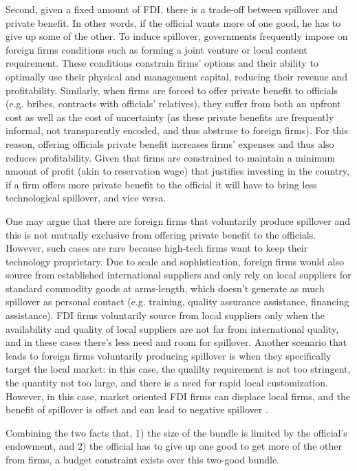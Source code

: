 Second, given a fixed amount of FDI, there is a trade-off between spillover and private benefit. In other words, if the official wants more of one good, he has to give up some of the other. To induce spillover, governments frequently impose on foreign firms conditions such as forming a joint venture or local content requirement. These conditions constrain firms' options and their ability to optimally use their physical and management capital, reducing their revenue and profitability. Similarly, when firms are forced to offer private benefit to officials (e.g. bribes, contracts with officials' relatives), they suffer from both an upfront cost as well as the cost of uncertainty (as these private benefits are frequently informal, not transparently encoded, and thus abstruse to foreign firms). For this reason, offering officials private benefit increases firms' expenses and thus also reduces profitability. Given that firms are constrained to maintain a minimum amount of profit (akin to reservation wage) that justifies investing in the country, if a firm offers more private benefit to the official it will have to bring less technological spillover, and vice versa.

One may argue that there are foreign firms that voluntarily produce spillover and this is not mutually exclusive from offering private benefit to the officials. However, such cases are rare because high-tech firms want to keep their technology proprietary. Due to scale and sophistication, foreign firms would also source from established international suppliers and only rely on local suppliers for standard commodity goods at arms-length, which doesn't generate as much spillover as personal contact (e.g. training, quality assurance assistance, financing assistance). FDI firms voluntarily source from local suppliers only when the availability and quality of local suppliers are not far from international quality, and in these cases there's less need and room for spillover. Another scenario that leads to foreign firms voluntarily producing spillover is when they specifically target the local market: in this case, the qualilty requirement is not too stringent, the quantity not too large, and there is a need for rapid local customization. However, in this case, market oriented FDI firms can displace local firms, and the benefit of spillover is offset and can lead to negative spillover \citep{Mody2004}.

Combining the two facts that, 1) the size of the bundle is limited by the official's endowment, and 2) the official has to give up one good to get more of the other from firms, a budget constraint exists over this two-good bundle.

